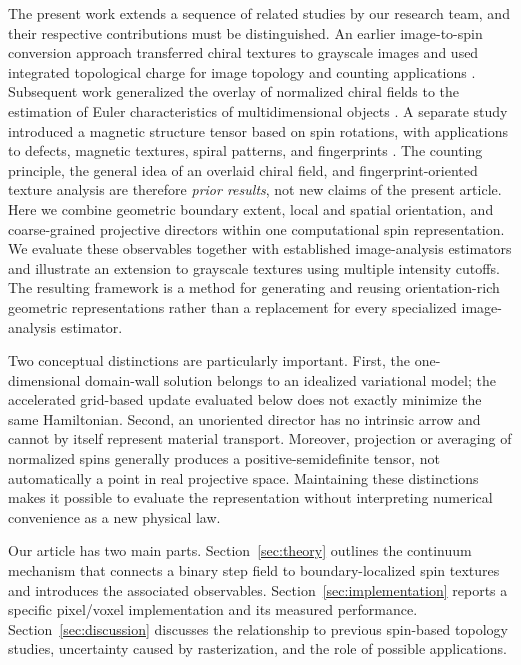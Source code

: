 \documentclass[11pt,a4paper]{article}
\begin{document}
The present work extends a sequence of related studies by our research team, and their respective contributions must be distinguished. An earlier image-to-spin conversion approach transferred chiral textures to grayscale images and used integrated topological charge for image topology and counting applications \cite{Park2024AMT}. Subsequent work generalized the overlay of normalized chiral fields to the estimation of Euler characteristics of multidimensional objects \cite{Moon2025SR}. A separate study introduced a magnetic structure tensor based on spin rotations, with applications to defects, magnetic textures, spiral patterns, and fingerprints \cite{Park2025iScience}. The counting principle, the general idea of an overlaid chiral field, and fingerprint-oriented texture analysis are therefore \emph{prior results}, not new claims of the present article. Here we combine geometric boundary extent, local and spatial orientation, and coarse-grained projective directors within one computational spin representation. We evaluate these observables together with established image-analysis estimators and illustrate an extension to grayscale textures using multiple intensity cutoffs. The resulting framework is a method for generating and reusing orientation-rich geometric representations rather than a replacement for every specialized image-analysis estimator.

Two conceptual distinctions are particularly important. First, the one-dimensional domain-wall solution belongs to an idealized variational model; the accelerated grid-based update evaluated below does not exactly minimize the same Hamiltonian. Second, an unoriented director has no intrinsic arrow and cannot by itself represent material transport. Moreover, projection or averaging of normalized spins generally produces a positive-semidefinite tensor, not automatically a point in real projective space. Maintaining these distinctions makes it possible to evaluate the representation without interpreting numerical convenience as a new physical law.

Our article has two main parts. Section~\ref{sec:theory} outlines the continuum mechanism that connects a binary step field to boundary-localized spin textures and introduces the associated observables. Section~\ref{sec:implementation} reports a specific pixel/voxel implementation and its measured performance. Section~\ref{sec:discussion} discusses the relationship to previous spin-based topology studies, uncertainty caused by rasterization, and the role of possible applications.
\end{document}
